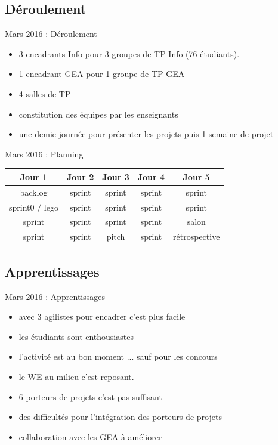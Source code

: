 \documentclass{beamer}
\begin{document}
\subsection{Déroulement}
\begin{frame}{Mars 2016 : Déroulement}
  \begin{itemize}
    \item 3 encadrants Info pour 3 groupes de TP Info (76 étudiants).
    \item 1 encadrant GEA pour 1 groupe de TP GEA
    \item 4 salles de TP
    \item constitution des équipes par les enseignants
    \item une demie journée pour présenter les projets puis 1 semaine de projet
  \end{itemize}
\end{frame}

\begin{frame}{Mars 2016 : Planning}
  \begin{center}
    \begin{tabular}{| c | c | c || c | c |}
      \hline
      \textbf{Jour 1} & \textbf{Jour 2} & \textbf{Jour 3} & \textbf{Jour 4} & \textbf{Jour 5} \\
      \hline \hline
      backlog         & sprint          & sprint          & sprint          & sprint          \\
      \hline
      sprint0 / lego  & sprint          & sprint          & sprint          & sprint          \\
      \hline \hline
      sprint          & sprint          & sprint          & sprint          & salon           \\
      \hline
      sprint          & sprint          & pitch           & sprint          & rétrospective   \\
      \hline
    \end{tabular}
  \end{center}
\end{frame}

\subsection{Apprentissages}
\begin{frame}{Mars 2016 : Apprentissages}
  \begin{itemize}
    \item avec 3 agilistes pour encadrer c'est plus facile
    \item les étudiants sont enthousiastes
    \item l'activité est au bon moment ... sauf pour les concours
    \item le WE au milieu c'est reposant.
    \item 6 porteurs de projets c'est pas suffisant
    \item des difficultés pour l'intégration des porteurs de projets
    \item collaboration avec les GEA à améliorer
  \end{itemize}
\end{frame}
\end{document}
